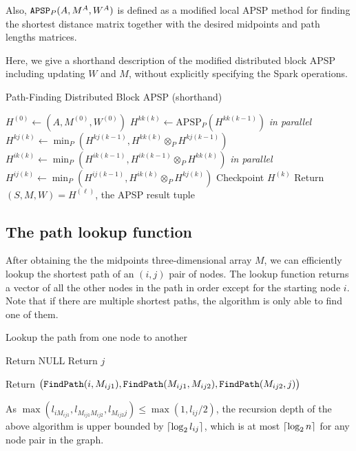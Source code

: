 \documentclass{article} %
\DeclarePairedDelimiter\ceil{\lceil}{\rceil}
\begin{document}
Also, ${\tt APSP}_P(A, M^A, W^A)$ is defined as a modified local APSP method for finding the shortest distance matrix together with the desired midpoints and path lengths matrices. 

Here, we give a shorthand description of the modified distributed block APSP including updating $W$ and $M$, without explicitly specifying the Spark operations.

\begin{algorithm}[H]
\caption{Path-Finding Distributed Block APSP (shorthand)}
\begin{algorithmic}
  \State $H^{(0)} \leftarrow (A, M^{(0)}, W^{(0)})$
    \State [A-step]
    \State $H^{kk(k)} \leftarrow \text{APSP}_P(H^{kk(k-1)})$
    \State [B-step]
     \emph{in parallel}
        \State $H^{kj(k)} \leftarrow \min_P(H^{kj(k-1)}, H^{kk(k)} \otimes_P H^{kj(k-1)})$ 
      \EndIf
        \State $H^{ik(k)} \leftarrow \min_P(H^{ik(k-1)}, H^{ik(k-1)} \otimes_P H^{kk(k)})$
      \EndIf
    \EndFor
    \State [C-step]
     \emph{in parallel}
        \State $H^{ij(k)} \leftarrow \min_P(H^{ij(k-1)}, H^{ik(k)} \otimes_P H^{kj(k)})$
      \EndIf
    \EndFor
    \State [D-step]
      \State Checkpoint $H^{(k)}$
    \EndIf
  \EndFor
  \State Return $(S, M, W) = H^{(\ell)}$, the APSP result tuple 
  \EndFunction
\end{algorithmic}
\end{algorithm}

\subsection{The path lookup function} \label{sec:correctness}
After obtaining the the midpoints three-dimensional array $M$, we can efficiently lookup the shortest path 
of an $(i, j)$ pair of nodes. The lookup function returns a vector of all the other nodes in the path in order except for the starting node $i$. Note that if there are multiple shortest paths, the algorithm is only able to find 
one of them.

\begin{algorithm}[H]
\caption{Lookup the path from one node to another}
\begin{algorithmic}
  \State Return NULL
 \EndIf
  \State Return $j$
 \EndIf
  
  Return $\big({\tt FindPath}(i, M_{ij1}), {\tt FindPath}(M_{ij1}, M_{ij2}), {\tt FindPath}(M_{ij2}, j)\big)$
\EndFunction
\end{algorithmic}
\end{algorithm}

As $\max(l_{iM_{ij1}}, l_{M_{ij1}M_{ij2}}, l_{M_{ij2}j}) \leq \max(1, l_{ij}/2)$, the recursion depth of the above
 algorithm is upper bounded by $\ceil{\log_2 l_{ij}}$, which is at most $\ceil{\log_2 n}$ for any node pair in the graph.
\end{document}
